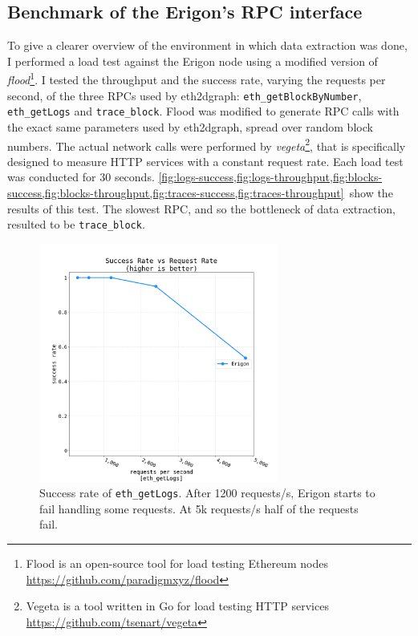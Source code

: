 \subsection{Benchmark of the Erigon's RPC interface}

To give a clearer overview of the environment in which data extraction was done, I performed a load test against the Erigon node using a modified version of \textit{flood}\footnote{Flood is an open-source tool for load testing Ethereum nodes \url{https://github.com/paradigmxyz/flood}}. I tested the throughput and the success rate, varying the requests per second, of the three RPCs used by eth2dgraph: {\tt eth\_getBlockByNumber}, {\tt eth\_getLogs} and {\tt trace\_block}. Flood was modified to generate RPC calls with the exact same parameters used by eth2dgraph, spread over random block numbers. The actual network calls were performed by \textit{vegeta}\footnote{Vegeta is a tool written in Go for load testing HTTP services \url{https://github.com/tsenart/vegeta}}, that is specifically designed to measure HTTP services with a constant request rate. Each load test was conducted for 30 seconds. \cref{fig:logs-success,fig:logs-throughput,fig:blocks-success,fig:blocks-throughput,fig:traces-success,fig:traces-throughput}~show the results of this test. The slowest RPC, and so the bottleneck of data extraction, resulted to be {\tt trace\_block}. 

\begin{figure}[H]
    \centering
    \includegraphics[width=0.7\textwidth]{Figures/results/load_tests/logs/success_rate_logs.png}
    \caption{Success rate of {\tt eth\_getLogs}. After 1200 requests/s, Erigon starts to fail handling some requests. At 5k requests/s half of the requests fail. }
    \label{fig:logs-success}
\end{figure}

